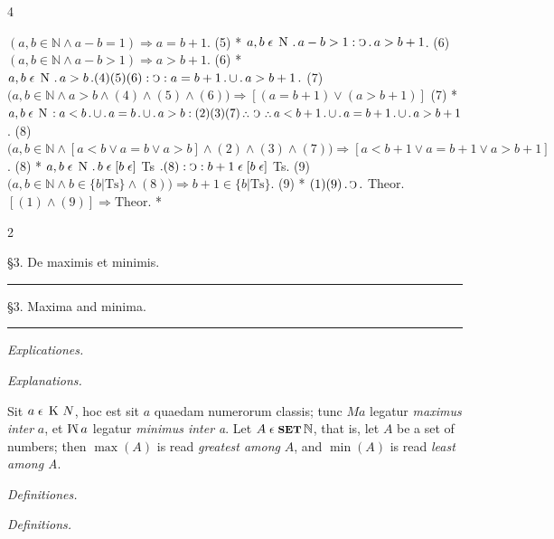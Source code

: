 \documentclass{book}
\newcommand{\s}{\switchcolumn} %
\newcommand{\C}{\mathop{\sbox0{$\displaystyle$$\reflectbox{C}$} %
\raisebox{-\height+\ht0-0.05cm}[\ht0][\dp0]{\scalebox{0.8}[0.8]{\copy0}}}\displaylimits} %
\newcommand{\p}{\mathop{\sbox0{$\displaystyle$$.$}
\raisebox{-\height+\ht0}[\ht0][\dp0]{\scalebox{1}[1]{\copy0}}}\displaylimits} %
\newcommand{\pppNoSpace}{\leavevmode\lower0ex\hbox{.}\kern-0.1em\raise0.7ex\hbox{.}\kern-0.1em\lower0ex\hbox{.}} %
\newcommand{\ppp}{\thinspace \pppNoSpace\thinspace} %
\newcommand{\mini}{\mathop{\rotatebox[origin=c]{180}{M}}}
\newcommand{\smallIn}{\ensuremath{\mathrel{\epsilon}}}
\newcommand{\K}{\mathop{\thinspace \text{K} \thinspace}}
\newcommand{\N}{\mathop{\thinspace \text{N} \thinspace}}
\newcommand{\setOfSets}{\mathop{\text{{\footnotesize \textbf{SET}}}}}
\renewcommand{\rightarrow}{\Rightarrow}
\newcommand\peanoHeadingSmall[1]{ \vspace{0.75cm} \textit{#1} \nopagebreak[4]

\vspace{0.25cm} \nopagebreak[1]}
\newcommand\peanoHeadingMedium[1]{ \vspace{1cm} {\Large #1} \nopagebreak[4]

  \noindent\rule{1cm}{0.4pt} \nopagebreak[1]}
\newenvironment{translateTwoCol}
               { %
                 \columnratio{0.5, 0.5}
                 \begin{paracol}{2}
                 \newcommand{\LAT}{\switchcolumn[0]*}
                 \newcommand{\ENG}{\switchcolumn[1]}
               }
               { %
                 \let\ENG\undefined
                 \let\LAT\undefined
                 \end{paracol}
               }
\newenvironment{translateFourCol}[4]
               { %
                 \setcolumnwidth{#1\fill/1em, #2\fill/\columnsep, #3\fill/1em, #4\fill}
                 \begin{paracol}{4}
                 \newcommand{\LAT}{\switchcolumn[0]*}
                 \newcommand{\ENG}{\switchcolumn[2]}
               }
               { %
                 \let\ENG\undefined
                 \let\LAT\undefined
                 \end{paracol}
               }
\begin{document}
\begin{translateFourCol}{0.08}{0.42}{0.08}{0.42}
\ENG
\s $(a,b \in \mathbb{N} \wedge a - b = 1) \rightarrow a = b + 1$. \hfill (5)
\LAT
\s $a,b \smallIn \N \p a - b > 1 : \C \p a > b + 1$. \hfill (6)
\ENG
\s $(a,b \in \mathbb{N} \wedge a - b > 1) \rightarrow a > b + 1$. \hfill (6)
\LAT
\s $a,b \smallIn \N \p a > b \p (4)(5)(6) : \C : a = b + 1 \p \cup \p a > b + 1 \p$ \hfill (7)
\ENG
\s $\big( a,b \in \mathbb{N} \wedge a > b \wedge (4) \wedge (5) \wedge (6) \big) \rightarrow [(a = b + 1) \vee (a > b + 1)]$ \hfill (7)
\LAT
\s $a,b \smallIn \N : a < b \p \cup \p a = b \p \cup \p a > b : (2)(3)(7) \ppp \C \ppp a < b + 1 \p \cup \p a = b + 1 \p \cup \p a > b + 1$. \hfill (8)
\ENG
\s $\Big( a,b \in \mathbb{N} \wedge [a < b \vee a = b \vee a > b] \wedge (2) \wedge (3) \wedge (7) \Big) \rightarrow [a < b + 1 \vee a = b + 1 \vee a > b + 1]$. \hfill (8)
\LAT
\s $a,b \smallIn \N \p b \smallIn [b \smallIn]$ Ts $\p (8) : \C : b + 1 \smallIn [b \smallIn]$ Ts. \hfill (9)
\ENG
\s $\big( a,b \in \mathbb{N} \wedge b \in \{ b | \text{Ts} \} \wedge (8) \big) \rightarrow b + 1 \in \{ b | \text{Ts} \}$. \hfill (9)
\LAT
\s $(1)(9) \p \C \p$ Theor.
\ENG
\s $[(1) \wedge (9)] \rightarrow \text{Theor}$.
\LAT
\end{translateFourCol}

\begin{translateTwoCol}
\centering
{}
{}
\peanoHeadingMedium{\S3. De maximis et minimis.}
\s
\peanoHeadingMedium{\S3. Maxima and minima.}
\s*
{}
{}
\peanoHeadingSmall{Explicationes.}
\s
\peanoHeadingSmall{Explanations.}
\s*
\raggedright
Sit $a \smallIn \K N$, hoc est sit $a$ quaedam numerorum classis; tunc $M a$ legatur \emph{maximus inter} $a$, et $\mini a$ legatur \emph{minimus inter a}.
\s
Let $A \smallIn \setOfSets \mathbb{N}$, that is, let $A$ be a set of numbers; then $\max(A)$ is read \emph{greatest among} $A$, and $\min(A)$ is read \emph{least among A}.
\s*
\centering
{}
{}
\peanoHeadingSmall{Definitiones.}
\s
\peanoHeadingSmall{Definitions.}
\end{translateTwoCol}
\end{document}
